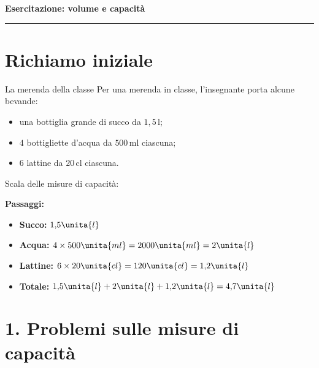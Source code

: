 \begin{center}
  {\Huge \color{mainblue}\textbf{Esercitazione: volume e capacità}}\\[0.2cm]
  \rule{0.82\linewidth}{0.5pt}
\end{center}


\section*{Richiamo iniziale}

\begin{esercizio}{La merenda della classe}
Per una merenda in classe, l'insegnante porta alcune bevande:

\begin{itemize}
  \item una bottiglia grande di succo da $1{,}5\,\mathrm{l}$;
  \item $4$ bottigliette d'acqua da $500\,\mathrm{ml}$ ciascuna;
  \item $6$ lattine da $20\,\mathrm{cl}$ ciascuna.
\end{itemize}


\vspace{0.5cm}

\noindent
Scala delle misure di capacità:

\vspace{0.2cm}


\responsespace{5.8cm}

\begin{soluzione}
  \textbf{Passaggi:}
  \begin{itemize}
    \item \textbf{Succo:} $1{,}5\unita{l}$
    \item \textbf{Acqua:} $4 \times 500\unita{ml} = 2000\unita{ml} = 2\unita{l}$
    \item \textbf{Lattine:} $6 \times 20\unita{cl} = 120\unita{cl} = 1{,}2\unita{l}$
    \item \textbf{Totale:} $1{,}5\unita{l} + 2\unita{l} + 1{,}2\unita{l} = 4{,}7\unita{l}$
  \end{itemize}
\end{soluzione}
\end{esercizio}

\condnewpage

\section*{1. Problemi sulle misure di capacità}

